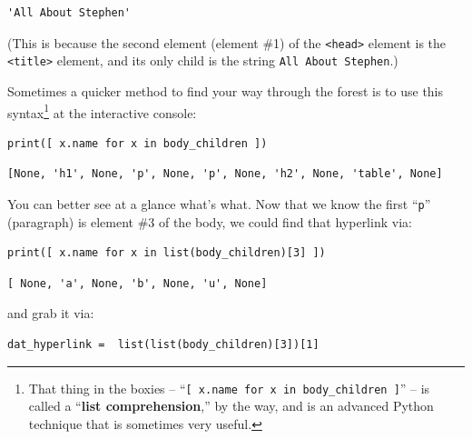 \begin{Verbatim}[fontsize=\small,samepage=true,frame=leftline,framesep=5mm,framerule=1mm]
'All About Stephen'
\end{Verbatim}


(This is because the second element (element \#1) of the \texttt{<head>} element
is the \texttt{<title>} element, and its only child is the string
\texttt{\textquotesingle All About Stephen\textquotesingle}.)

Sometimes a quicker method to find your way through the forest is to use this
syntax\footnote{That thing in the boxies -- ``\texttt{[ x.name for x in
body\_children ]}'' -- is called a ``\textbf{list comprehension},'' by the way,
and is an advanced Python technique that is sometimes very useful.} at the
interactive console:


\begin{Verbatim}[fontsize=\small,samepage=true,frame=single,framesep=3mm]
print([ x.name for x in body_children ])
\end{Verbatim}
\vspace{-.2in}

\begin{Verbatim}[fontsize=\footnotesize,samepage=true,frame=leftline,framesep=2mm,framerule=1mm]
[None, 'h1', None, 'p', None, 'p', None, 'h2', None, 'table', None]
\end{Verbatim}


You can better see at a glance what's what. Now that we know the first
``\texttt{p}'' (paragraph) is element \#3 of the body, we could find that
hyperlink via:

\begin{Verbatim}[fontsize=\small,samepage=true,frame=single,framesep=3mm]
print([ x.name for x in list(body_children)[3] ])
\end{Verbatim}
\vspace{-.2in}

\begin{Verbatim}[fontsize=\small,samepage=true,frame=leftline,framesep=5mm,framerule=1mm]
[ None, 'a', None, 'b', None, 'u', None]
\end{Verbatim}

and grab it via:

\begin{Verbatim}[fontsize=\small,samepage=true,frame=single,framesep=3mm]
dat_hyperlink =  list(list(body_children)[3])[1]
\end{Verbatim}

